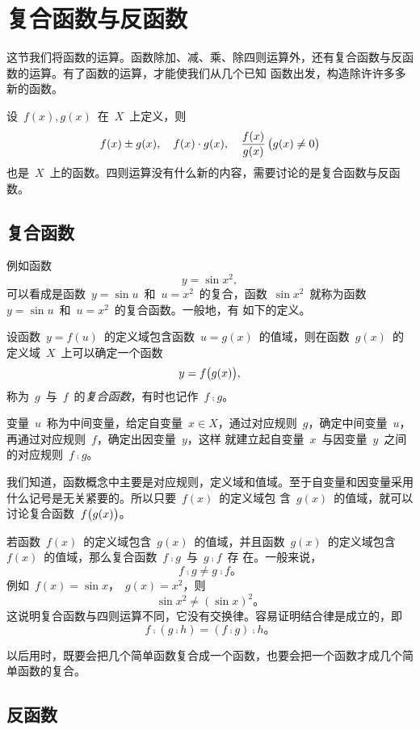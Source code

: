 \section{复合函数与反函数}

这节我们将函数的运算。函数除加、减、乘、除四则运算外，还有复合函数与反函数的运算。有了函数的运算，才能使我们从几个已知
函数出发，构造除许许多多新的函数。

设~$f(x),g(x)$~在~$X$~上定义，则
\[
  f(x)\pm g(x),\quad f(x)\cdot g(x),\quad\frac{f(x)}{g(x)}\,\bigl\lparen g(x)\neq0\bigr\rparen
\]
也是~$X$~上的函数。四则运算没有什么新的内容，需要讨论的是复合函数与反函数。

\subsection{复合函数}

例如函数
\[
  y=\sin x^2,
\]
可以看成是函数~$y=\sin u$~和~$u=x^2$~的复合，函数~$\sin x^2$~就称为函数~$y=\sin u$~和~$u=x^2$~的复合函数。一般地，有
如下的定义。

\begin{definition}
设函数~$y=f(u)$~的定义域包含函数~$u=g(x)$~的值域，则在函数~$g(x)$~的定义域~$X$~上可以确定一个函数
\[
  y=f\bigl\lparen g(x)\bigr\rparen,
\]
称为~$g$~与~$f$~的\emph{复合函数}，有时也记作~$f\comp g$。
\end{definition}

变量~$u$~称为中间变量，给定自变量~$x\in X$，通过对应规则~$g$，确定中间变量~$u$，再通过对应规则~$f$，确定出因变量~$y$，这样
就建立起自变量~$x$~与因变量~$y$~之间的对应规则~$f\comp g$。

我们知道，函数概念中主要是对应规则，定义域和值域。至于自变量和因变量采用什么记号是无关紧要的。所以只要~$f(x)$~的定义域包
含~$g(x)$~的值域，就可以讨论复合函数~$f\bigl\lparen g(x)\bigr\rparen$。

若函数~$f(x)$~的定义域包含~$g(x)$~的值域，并且函数~$g(x)$~的定义域包含~$f(x)$~的值域，那么复合函数~$f\comp g$~与~$g\comp f$~存
在。一般来说，
\[
  f\comp g\neq g\comp f。
\]
例如~$f(x)=\sin x$，~$g(x)=x^2$，则
\[
  \sin x^2\neq(\sin x)^2。
\]
这说明复合函数与四则运算不同，它没有交换律。容易证明结合律是成立的，即
\[
  f\comp(g\comp h)=(f\comp g)\comp h。
\]

以后用时，既要会把几个简单函数复合成一个函数，也要会把一个函数才成几个简单函数的复合。


\subsection{反函数}

